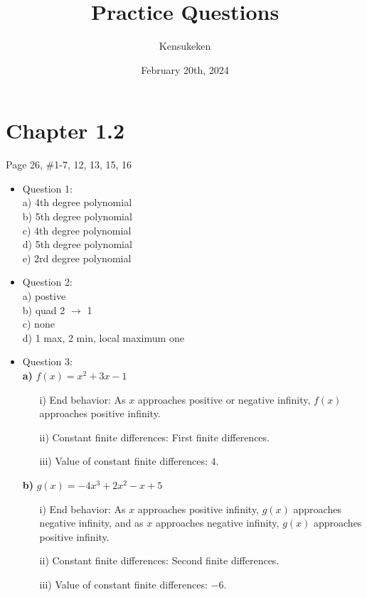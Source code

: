 \documentclass{article}
\title{Practice Questions}
\author{Kensukeken}
\date{February 20th, 2024}
\begin{document}
\maketitle
\section*{Chapter 1.2}
Page 26, \#1-7, 12, 13, 15, 16
\begin{itemize}
    \item Question 1: \\
    a) 4th degree polynomial \\
    b) 5th degree polynomial \\
    c) 4th degree polynomial \\
    d) 5th degree polynomial \\
    e) 2rd degree polynomial \\
    
    \item Question 2: \\
    a) postive \\
    b) quad 2 $\to$ 1 \\ 
    c) none \\ 
    d) 1 max, 2 min, local maximum one \\ 
    
    \item Question 3:\\
\textbf{a)} $f(x) = x^2 +3x- 1$
\begin{enumerate}
    \item[i)] End behavior: As $x$ approaches positive or negative infinity, $f(x)$ approaches positive infinity.
    \item[ii)] Constant finite differences: First finite differences.
    \item[iii)] Value of constant finite differences: $4$.
\end{enumerate}

\textbf{b)} $g(x) =-4x^3+ 2x^2 - x + 5$
\begin{enumerate}
    \item[i)] End behavior: As $x$ approaches positive infinity, $g(x)$ approaches negative infinity, and as $x$ approaches negative infinity, $g(x)$ approaches positive infinity.
    \item[ii)] Constant finite differences: Second finite differences.
    \item[iii)] Value of constant finite differences: $-6$.
\end{enumerate}


\end{itemize}
\end{document}
